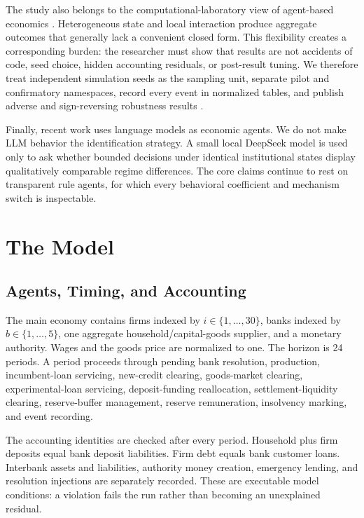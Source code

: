 \documentclass[11pt,a4paper]{article}
\begin{document}
The study also belongs to the computational-laboratory view of agent-based economics \citep{dosi2017macroeconomic, hendry2025agent}. Heterogeneous state and local interaction produce aggregate outcomes that generally lack a convenient closed form. This flexibility creates a corresponding burden: the researcher must show that results are not accidents of code, seed choice, hidden accounting residuals, or post-result tuning. We therefore treat independent simulation seeds as the sampling unit, separate pilot and confirmatory namespaces, record every event in normalized tables, and publish adverse and sign-reversing robustness results \citep{detail2026bankofengland}.

Finally, recent work uses language models as economic agents. We do not make LLM behavior the identification strategy. A small local DeepSeek model is used only to ask whether bounded decisions under identical institutional states display qualitatively comparable regime differences. The core claims continue to rest on transparent rule agents, for which every behavioral coefficient and mechanism switch is inspectable.

\section{The Model}

\subsection{Agents, Timing, and Accounting}

The main economy contains firms indexed by $i \in \{1,\dots,30\}$, banks indexed by $b \in \{1,\dots,5\}$, one aggregate household/capital-goods supplier, and a monetary authority. Wages and the goods price are normalized to one. The horizon is 24 periods. A period proceeds through pending bank resolution, production, incumbent-loan servicing, new-credit clearing, goods-market clearing, experimental-loan servicing, deposit-funding reallocation, settlement-liquidity clearing, reserve-buffer management, reserve remuneration, insolvency marking, and event recording.

The accounting identities are checked after every period. Household plus firm deposits equal bank deposit liabilities. Firm debt equals bank customer loans. Interbank assets and liabilities, authority money creation, emergency lending, and resolution injections are separately recorded. These are executable model conditions: a violation fails the run rather than becoming an unexplained residual.
\end{document}
